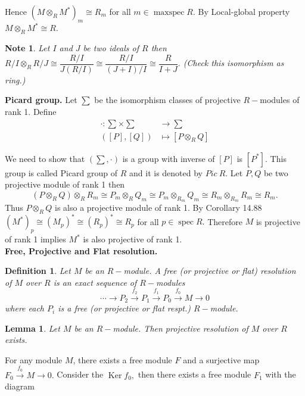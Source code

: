 \documentclass[11pt]{amsart}
\newtheorem{defn}[theorem]{Definition}
\newtheorem{note}[theorem]{Note}
\newtheorem{lemma}[theorem]{Lemma}%
\DeclareMathOperator{\Ker}{\text{Ker}}
\DeclareMathOperator{\spec}{\text{spec}}
\DeclareMathOperator{\mspec}{\text{maxspec}}
\begin{document}
Hence $(M\otimes_R M^*)_m\cong R_m$ for all $m\in \mspec R.$ By Local-global property $M\otimes_R M^*\cong R.$

\begin{note}

Let $I$ and $J$ be two ideals of $R$ then  $R/I\otimes_R R/J\cong \dfrac{R/I}{J(R/I)}\cong \dfrac{R/I}{(J+I)/I}\cong \dfrac{R}{I+J}.$ (Check this isomorphism as ring.)

\end{note}


\textbf{Picard group.} Let $\sum$ be the isomorphism classes of projective $R-$modules of rank 1. Define \begin{align*}
\cdot:\sum\times\sum&\to \sum\\
([P],[Q])&\mapsto [P\otimes_R Q]
\end{align*}

We need to show that $\left(\sum,\cdot\right)$ is a group with inverse of $[P]$ is $[P^*].$ This group is called Picard group of $R$ and it is denoted by $Pic~R.$ Let $P,Q$ be two projective module of rank 1 then $$(P\otimes_R Q)\otimes_R R_m\cong P_m\otimes_R Q_m\cong P_m\otimes_{R_m} Q_m\cong R_m\otimes_{R_m} R_m\cong R_m.$$ Thus $P\otimes_R Q$ is also a projective module of rank 1. By Corollary 14.88 $(M^*)_p\cong (M_p)^*\cong (R_p)^*\cong R_p$ for all $p\in\spec R.$ Therefore $M$ is projective of rank 1 implies $M^*$ is also projective of rank 1.\\

\textbf{Free, Projective and Flat resolution.}

\begin{defn}

Let $M$ be an $R-$module. A free (or projective or flat) resolution of $M$ over $R$ is an exact sequence of $R-$modules $$\cdots\to P_2\xrightarrow{f_2} P_1\xrightarrow{f_1} P_0\xrightarrow{f_0} M\to 0$$
where each $P_i$ is a free (or projective or flat respt.) $R-$module.
\end{defn}

\begin{lemma}

Let $M$ be an $R-$module. Then projective resolution of $M$ over $R$ exists.

\end{lemma}

\proof For any module $M$, there exists a free module $F$ and a surjective map $F_0\xrightarrow{f_0} M\to 0.$ Consider the $\Ker f_0,$ then there exists a free module $F_1$ with the diagram 
\end{document}
